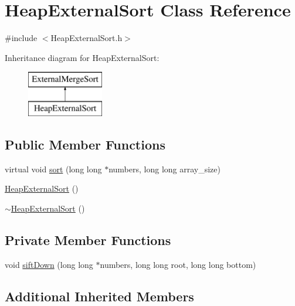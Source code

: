 \hypertarget{class_heap_external_sort}{}\section{Heap\+External\+Sort Class Reference}
\label{class_heap_external_sort}


{\ttfamily \#include $<$Heap\+External\+Sort.\+h$>$}

Inheritance diagram for Heap\+External\+Sort\+:\begin{figure}[H]
\begin{center}
\leavevmode
\includegraphics[height=2.000000cm]{class_heap_external_sort}
\end{center}
\end{figure}
\subsection*{Public Member Functions}
\begin{DoxyCompactItemize}
\item 
virtual void \hyperlink{class_heap_external_sort_a908087ce13932b268a35e1184a05ea44}{sort} (long long $\ast$numbers, long long array\+\_\+size)
\item 
\hyperlink{class_heap_external_sort_a9e6236e47430f0b530b287a6d7cf3a8b}{Heap\+External\+Sort} ()
\item 
\hyperlink{class_heap_external_sort_afa76473510a8cb610bb94bca5b5202c9}{$\sim$\+Heap\+External\+Sort} ()
\end{DoxyCompactItemize}
\subsection*{Private Member Functions}
\begin{DoxyCompactItemize}
\item 
void \hyperlink{class_heap_external_sort_a927eea9dcf44a9c7d53db1039bc7e21f}{sift\+Down} (long long $\ast$numbers, long long root, long long bottom)
\end{DoxyCompactItemize}
\subsection*{Additional Inherited Members}


